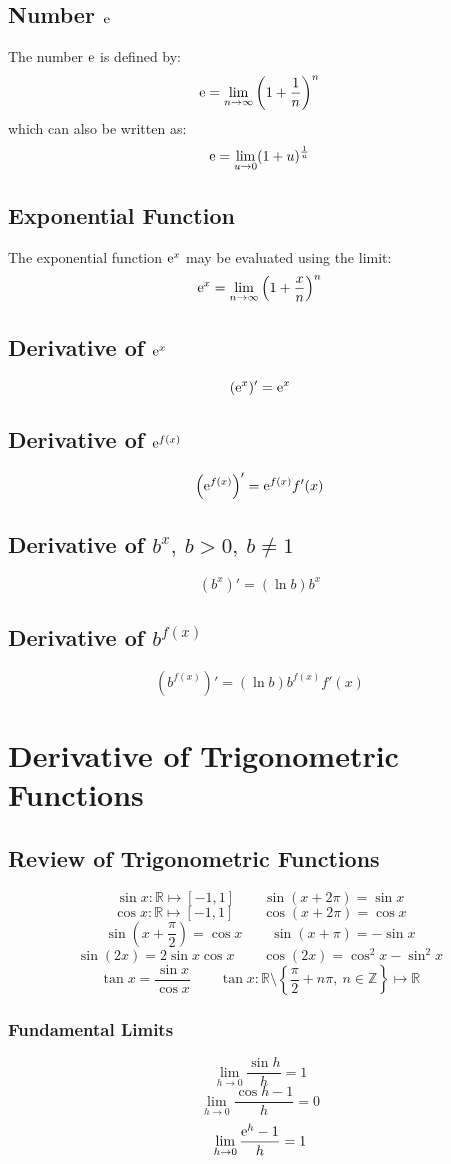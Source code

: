 		\subsection{Number $\mathrm{e}$}
			The number $\mathrm{e}$ is defined by:
			\[\mathrm{e} = \lim_{n \to \infty}\left(1 + \frac{1}{n}\right)^n\]
			which can also be written as:
			\[\mathrm{e} = \lim_{u \to 0}(1 + u)^{\frac{1}{u}}\]
		\subsection{Exponential Function}
			The exponential function $\mathrm{e}^x$ may be evaluated using the limit:
			\[\mathrm{e}^x=\lim_{n \to \infty}\left(1 + \frac{x}{n}\right)^n\]
		\subsection{Derivative of $\mathrm{e}^x$}
			\[(\mathrm{e}^x)' = \mathrm{e}^x\]
		\subsection{Derivative of $\mathrm{e}^{f(x)}$}
			\[\left(\mathrm{e}^{f(x)}\right)' = \mathrm{e}^{f(x)}f'(x)\]
		\subsection{Derivative of $b^x,\ b > 0,\ b \neq 1$}
			\[(b^x)' = (\ln b)b^x\]
		\subsection{Derivative of $b^{f(x)}$}
			\[\left(b^{f(x)}\right)' = (\ln b)b^{f(x)}f'(x)\]
	\setcounter{section}{3}
	\section{Derivative of Trigonometric Functions}
		\subsection{Review of Trigonometric Functions}
			\[\sin x: \mathbb{R} \mapsto [-1, 1] \qquad \sin(x+2\pi)=\sin x\]
			\[\cos x: \mathbb{R} \mapsto [-1, 1] \qquad \cos(x+2\pi)=\cos x\]
			\[\sin\left(x + \frac{\pi}{2}\right) = \cos x \qquad \sin(x+\pi) = -\sin x\]
			\[\sin(2x) = 2\sin x \cos x \qquad \cos(2x) = \cos^2 x - \sin^2 x\]
			\[\tan x = \frac{\sin x}{\cos x} \qquad \tan x: \mathbb{R} \setminus \left\{\frac{\pi}{2} + n\pi,\ n \in \mathbb{Z}\right\} \mapsto \mathbb{R}\]
			\subsubsection{Fundamental Limits}
				\[\lim_{h \to 0} \frac{\sin h}{h} = 1\]
				\[\lim_{h \to 0} \frac{\cos h - 1}{h} = 0\]
				\[\lim_{h \to 0} \frac{\mathrm{e}^h - 1}{h} = 1\]
